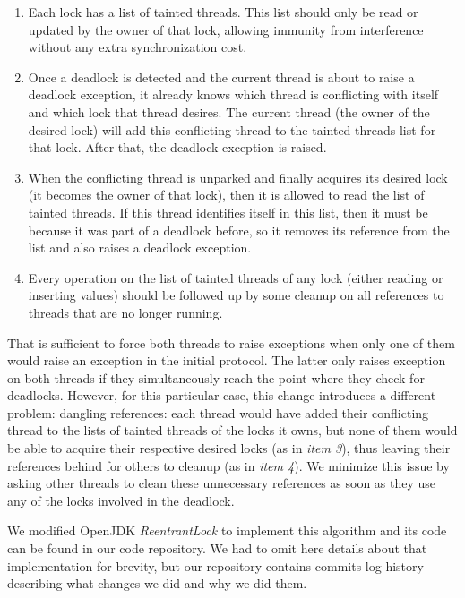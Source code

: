 \begin{enumerate}
\item Each lock has a list of tainted threads. This list should only be read or updated by the owner of that lock, allowing immunity from interference without any extra synchronization cost.
\item Once a deadlock is detected and the current thread is about to raise a deadlock exception, it already knows which thread is conflicting with itself and which lock that thread desires. The current thread (the owner of the desired lock) will add this conflicting thread to the tainted threads list for that lock. After that, the deadlock exception is raised.
\item When the conflicting thread is unparked and finally acquires its desired lock (it becomes the owner of that lock), then it is allowed to read the list of tainted threads. If this thread identifies itself in this list, then it must be because it was part of a deadlock before, so it removes its reference from the list and also raises a deadlock exception.
\item Every operation on the list of tainted threads of any lock (either reading or inserting values) should be followed up by some cleanup on all references to threads that are no longer running.
\end{enumerate}

That is sufficient to force both threads to raise exceptions when only one of them would raise an exception in the initial protocol. The latter only raises exception on both threads if they simultaneously reach the point where they check for deadlocks. However, for this particular case, this change introduces a different problem: dangling references:
each thread would have added their conflicting thread to the lists of tainted threads of the locks it owns, 
but none of them would be able to acquire their respective desired locks (as in \emph{item 3}),
thus leaving their references behind for others to cleanup (as in \emph{item 4}). We minimize this issue by asking other threads to clean these unnecessary references as soon as they use any of the locks involved in the deadlock.

We modified OpenJDK \emph{ReentrantLock} to implement this algorithm and its code can be found in our code repository\cite{repo}. We had to omit here details about that implementation for brevity, but our repository contains commits log history describing what changes we did and why we did them.

